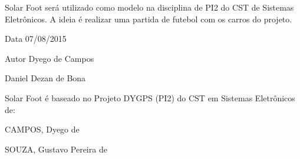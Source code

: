 Solar Foot será utilizado como modelo na disciplina de P\+I2 do C\+S\+T de Sistemas Eletrônicos. A ideia é realizar uma partida de futebol com os carros do projeto.



\begin{DoxyDate}{Data}
07/08/2015 
\end{DoxyDate}
\begin{DoxyAuthor}{Autor}
Dyego de Campos 

Daniel Dezan de Bona
\end{DoxyAuthor}
Solar Foot é baseado no Projeto D\+Y\+G\+P\+S (P\+I2) do C\+S\+T em Sistemas Eletrônicos de\+:
\begin{DoxyEnumerate}
\item C\+A\+M\+P\+O\+S, Dyego de
\item S\+O\+U\+Z\+A, Gustavo Pereira de 
\end{DoxyEnumerate}
